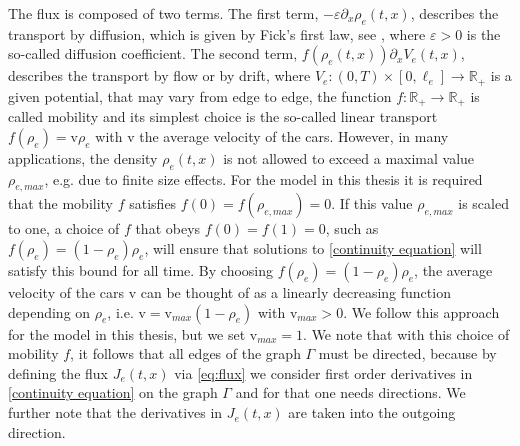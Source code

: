 The flux is composed of two terms. The first term, $- \varepsilon \partial_x \rho_e (t, x)$, describes the transport by diffusion, which is given by Fick's first law, see \cite{Fick:1855}, where $\varepsilon > 0$ is the so-called diffusion coefficient. The second term, $f(\rho_e(t, x)) \partial_x V_e(t, x)$, describes the transport by flow or by drift, where $V_e \colon (0,T) \times [0, \ell_e] \to \mathbb{R}_{+}$ is a given potential, that may vary from edge to edge, the function $f \colon \mathbb{R}_{+} \to \mathbb{R}_{+}$ is called mobility and its simplest choice is the so-called linear transport $f(\rho_e) = \mathrm{v} \rho_e$ with $\mathrm{v}$ the average velocity of the cars. However, in many applications, the density $\rho_e (t,x)$ is not allowed to exceed a maximal value $\rho_{e, max}$, e.g. due to finite size effects. For the model in this thesis it is required that the mobility $f$ satisfies $f(0) = f(\rho_{e, max}) = 0$. If this value $\rho_{e, max}$ is scaled to one, a choice of $f$ that obeys $f(0) = f(1) = 0$, such as $f(\rho_e) = (1-\rho_e) \rho_e$, will ensure that solutions to \eqref{continuity equation} will satisfy this bound for all time. By choosing $f(\rho_e) = (1-\rho_e) \rho_e$, the average velocity of the cars $\mathrm{v}$ can be thought of as a linearly decreasing function depending on $\rho_e$, i.e. $\mathrm{v} = \mathrm{v}_{max} (1-\rho_e)$ with $\mathrm{v}_{max} > 0$. We follow this approach for the model in this thesis, but we set $\mathrm{v}_{max} = 1$. We note that with this choice of mobility $f$, it follows that all edges of the graph $\Gamma$ must be directed, because by defining the flux $J_e(t,x)$ via \cref{eq:flux} we consider first order derivatives in \cref{continuity equation} on the graph $\Gamma$ and for that one needs directions. We further note that the derivatives in $J_e(t,x)$ are taken into the outgoing direction. \\

